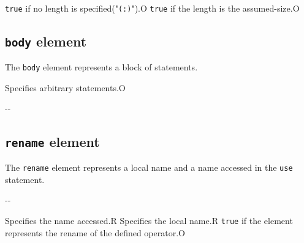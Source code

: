 \begin{XcodeMLAttributes}
{{\tt true} if no length is specified("{\tt (:)}").}{O}
{{\tt true} if the length is the assumed-size.}{O}
\end{XcodeMLAttributes}


\subsection{ {\tt body} element}

The {\tt body} element represents a block of statements.


\begin{XcodeMLChildElements}
{Specifies arbitrary statements.}{O}
\end{XcodeMLChildElements}

\begin{XcodeMLAttributes}
\XcodeMLAttrDef{-}{-}
{-}{-}
\end{XcodeMLAttributes}


\subsection{ {\tt rename} element}

The {\tt rename} element represents a local name and a name accessed in the {\tt use} statement.


\begin{XcodeMLChildElements}
\XcodeMLElementDef{-}
{-}{-}
\end{XcodeMLChildElements}

\begin{XcodeMLAttributes}
{Specifies the name accessed.}{R}
{Specifies the local name.}{R}
{{\tt true} if the element represents the rename of the defined operator.}{O}
\end{XcodeMLAttributes}


